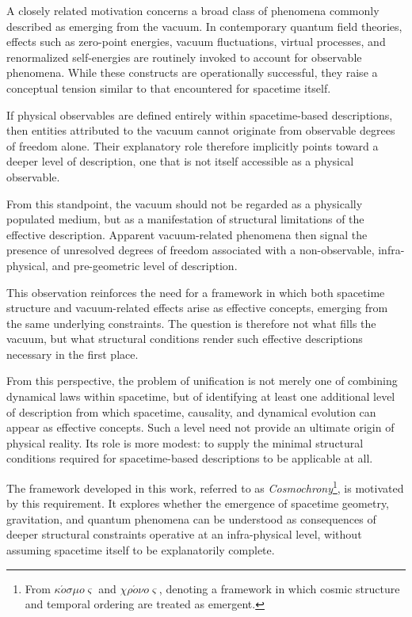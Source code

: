   A closely related motivation concerns a broad class of phenomena commonly
  described as emerging from the vacuum.
  In contemporary quantum field theories, effects such as zero-point energies,
  vacuum fluctuations, virtual processes, and renormalized self-energies are
  routinely invoked to account for observable phenomena.
  While these constructs are operationally successful, they raise a conceptual
  tension similar to that encountered for spacetime itself.

  If physical observables are defined entirely within spacetime-based descriptions,
  then entities attributed to the vacuum cannot originate from observable degrees
  of freedom alone.
  Their explanatory role therefore implicitly points toward a deeper level of
  description, one that is not itself accessible as a physical observable.

  From this standpoint, the vacuum should not be regarded as a physically populated
  medium, but as a manifestation of structural limitations of the effective
  description.
  Apparent vacuum-related phenomena then signal the presence of unresolved
  degrees of freedom associated with a non-observable, infra-physical, and
  pre-geometric level of description.

  This observation reinforces the need for a framework in which both spacetime
  structure and vacuum-related effects arise as effective concepts, emerging from
  the same underlying constraints.
  The question is therefore not what fills the vacuum, but what structural
  conditions render such effective descriptions necessary in the first place.

  From this perspective, the problem of unification is not merely one of combining
  dynamical laws within spacetime, but of identifying at least one additional
  level of description from which spacetime, causality, and dynamical evolution
  can appear as effective concepts.
  Such a level need not provide an ultimate origin of physical reality.
  Its role is more modest: to supply the minimal structural conditions required
  for spacetime-based descriptions to be applicable at all.

  The framework developed in this work, referred to as \emph{Cosmochrony}\footnote{%
  From \textit{$\kappa\acute{o}\sigma\mu o\varsigma$} and
  \textit{$\chi\rho\acute{o}\nu o\varsigma$}, denoting a framework in which
  cosmic structure and temporal ordering are treated as emergent.},
  is motivated by this requirement.
  It explores whether the emergence of spacetime geometry, gravitation, and
  quantum phenomena can be understood as consequences of deeper structural
  constraints operative at an infra-physical level, without assuming spacetime
  itself to be explanatorily complete.

